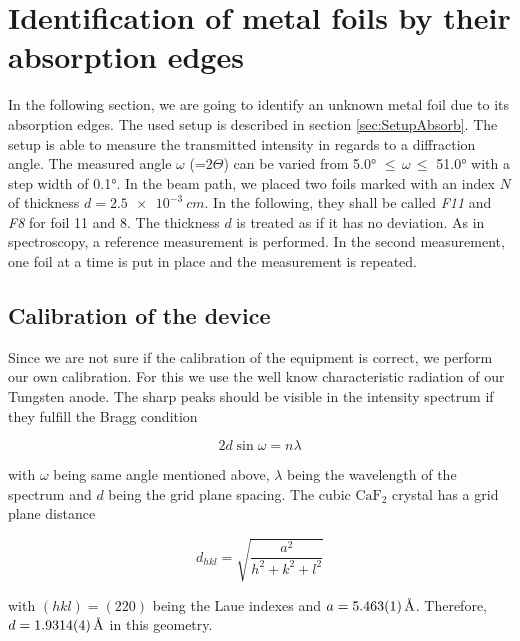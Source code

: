 \section{Identification of metal foils by their absorption edges}
\label{sec:absorb}

In the following section, we are going to identify an unknown metal foil due to its absorption edges. The used setup is described in section \cref{sec:SetupAbsorb}.
The setup is able to measure the transmitted intensity in regards to a diffraction angle. The measured angle $\omega$ (=$2\Theta$) can be varied from 
5.0° $\leqslant \, \omega \, \leqslant$ 51.0° with a step width of 0.1°. In the beam path, we placed two foils marked with an index $N$ of thickness $d = \SI{2.5e-3}{cm}$. In the following, they shall be called \textit{F11} and \textit{F8} for foil 11 and 8.
The thickness $d$ is treated as if it has no deviation. As in spectroscopy, a reference measurement is performed. In the 
second measurement, one foil at a time is put in place and the measurement is repeated. 

\subsection{Calibration of the device}

Since we are not sure if the calibration of the equipment is correct, we perform our own calibration.
For this we use the well know characteristic radiation of our Tungsten anode. The sharp peaks should be visible in the 
intensity spectrum if they fulfill the Bragg condition

\begin{equation}
    2 d \sin{\omega} = n \lambda
\end{equation}

with $\omega$ being same angle mentioned above, $ \lambda $ being the wavelength of the spectrum and $d$ being the grid plane spacing. The cubic $\mathrm{CaF}_2$ crystal has a 
grid plane distance 

\begin{equation}
    d_{hkl} = \sqrt{\frac{a^2}{h^2+k^2+l^2}}
\end{equation}

with $(hkl) = (220) $ being the Laue indexes and $a = \SI{5.463 \pm 0.001 }{ \angstrom}$. Therefore, $d = \SI{1.9314 \pm 0.0004}{ \angstrom} $ in this geometry.

